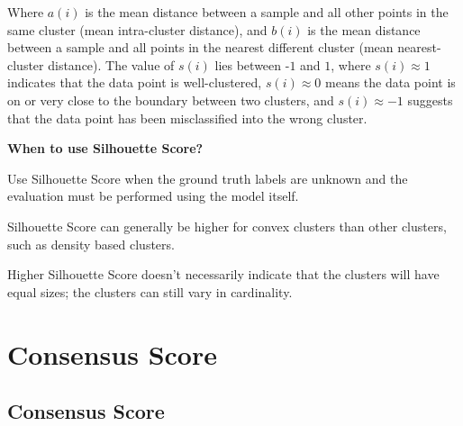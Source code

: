 Where  $a(i)$ is the mean distance between a sample and all other points in the same cluster (mean intra-cluster distance), 
and  $b(i)$ is the mean distance between a sample and all points in the nearest different cluster (mean nearest-cluster distance). 
The value of  $s(i)$ lies between -$1$ and  $1$, where  $s(i) \approx 1$ indicates that the data point is well-clustered, 
 $s(i) \approx 0$ means the data point is on or very close to the boundary between two clusters, and  $s(i) \approx -1$ 
suggests that the data point has been misclassified into the wrong cluster.

\textbf{When to use Silhouette Score?}

Use Silhouette Score when the ground truth labels are unknown and the evaluation must be performed using the model itself.

{
\item Silhouette Score can generally be higher for convex clusters than other clusters, such as density based clusters.
\item Higher Silhouette Score doesn't necessarily indicate that the clusters will have equal sizes; the clusters can still vary in cardinality. 
}

\clearpage
\thispagestyle{clusteringstyle}
\section{ Consensus Score}
\subsection{ Consensus Score}